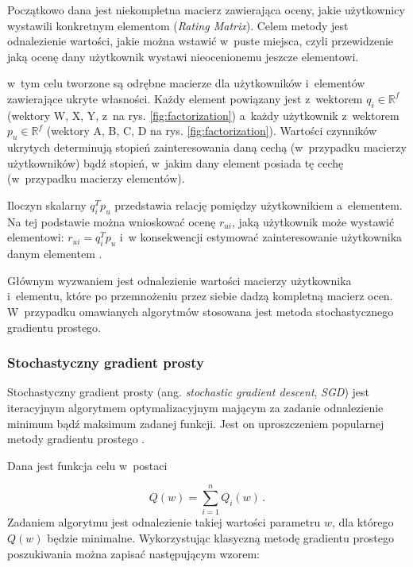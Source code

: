 \documentclass[twoside]{iisthesis}
\begin{document}
	 Początkowo dana jest niekompletna macierz zawierająca oceny, jakie użytkownicy wystawili konkretnym elementom (\textit{Rating Matrix}). Celem metody jest odnalezienie wartości, jakie można wstawić w~puste miejsca, czyli przewidzenie jaką ocenę dany użytkownik wystawi nieocenionemu jeszcze elementowi. 		
	 
	 w~tym celu tworzone są odrębne macierze dla użytkowników i~elementów zawierające ukryte własności. Każdy element powiązany jest z~wektorem $q_i \in \mathbb{R} ^f$ (wektory W, X, Y, z~na rys. \ref{fig:factorization}) a~każdy użytkownik z~wektorem $p_u \in \mathbb{R} ^f$ (wektory A, B, C, D na rys. \ref{fig:factorization}). Wartości czynników ukrytych determinują stopień zainteresowania daną cechą (w~przypadku macierzy użytkowników) bądź stopień, w~jakim dany element posiada tę cechę (w~przypadku macierzy elementów).		
	 
	 Iloczyn skalarny $q_i^T p_u$ przedstawia relację pomiędzy użytkownikiem a~elementem. Na tej podstawie można wnioskować ocenę $r_{ui}$, jaką użytkownik może wystawić elementowi: $r_{ui} = q_i^T p_u$ i~w konsekwencji estymować zainteresowanie użytkownika danym elementem \cite{koren2009matrix}.
	 
	 Głównym wyzwaniem jest odnalezienie wartości macierzy użytkownika i~elementu, które po przemnożeniu przez siebie dadzą kompletną macierz ocen. W~przypadku omawianych algorytmów stosowana jest metoda stochastycznego gradientu prostego. 
	 
	 \subsubsection{Stochastyczny gradient prosty}
	 
	 Stochastyczny gradient prosty (ang. \textit{stochastic gradient descent}, \textit{SGD}) jest iteracyjnym algorytmem optymalizacyjnym mającym za zadanie odnalezienie minimum bądź maksimum zadanej funkcji. Jest on uproszczeniem popularnej metody gradientu prostego \cite{bottou2012stochastic}.
	 
	 Dana jest funkcja celu w~postaci
	 
	 \begin{equation}
	 \label{eq:sgd1}
	 Q(w) = \sum_{i=1}^{n}Q_i(w)
	 \,.
	 \end{equation}			
	 Zadaniem algorytmu jest odnalezienie takiej wartości parametru $w$, dla którego $Q(w)$ będzie minimalne. Wykorzystując klasyczną metodę gradientu prostego poszukiwania można zapisać następującym wzorem:
	 
\end{document}
